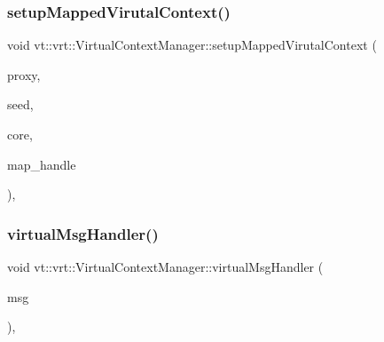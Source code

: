 \subsubsection{\texorpdfstring{setup\+Mapped\+Virutal\+Context()}{setupMappedVirutalContext()}}
{\footnotesize\ttfamily void vt\+::vrt\+::\+Virtual\+Context\+Manager\+::setup\+Mapped\+Virutal\+Context (\begin{DoxyParamCaption}\item[{\hyperlink{namespacevt_a1b417dd5d684f045bb58a0ede70045ac}{Virtual\+Proxy\+Type} const \&}]{proxy,  }\item[{\hyperlink{namespacevt_ae2e13198bdef4d5b8e603d6c1c7f0969}{Seed\+Type} const \&}]{seed,  }\item[{\hyperlink{namespacevt_a74b11b22c02feaabab8591acc87c7c52}{Core\+Type} const \&}]{core,  }\item[{\hyperlink{namespacevt_af64846b57dfcaf104da3ef6967917573}{Handler\+Type} const \&}]{map\+\_\+handle }\end{DoxyParamCaption})\hspace{0.3cm}{\ttfamily [inline]}, {\ttfamily [private]}}

\mbox{\label{structvt_1_1vrt_1_1_virtual_context_manager_abb1cc10ecf9f53a7f9486cf69446ee81}} 
\subsubsection{\texorpdfstring{virtual\+Msg\+Handler()}{virtualMsgHandler()}}
{\footnotesize\ttfamily void vt\+::vrt\+::\+Virtual\+Context\+Manager\+::virtual\+Msg\+Handler (\begin{DoxyParamCaption}\item[{\hyperlink{namespacevt_ac34f95a5e2b8109b55bfba52b074443d}{Base\+Message} $\ast$}]{msg }\end{DoxyParamCaption})\hspace{0.3cm}{\ttfamily [static]}, {\ttfamily [private]}}

\mbox{\label{structvt_1_1vrt_1_1_virtual_context_manager_a62719655b49a47446040710712da6419}} 
